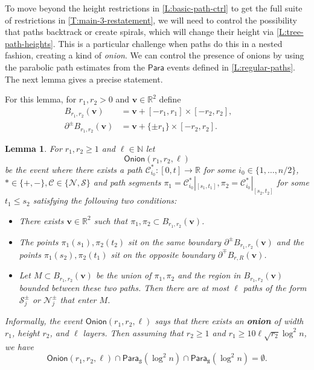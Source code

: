 \documentclass[11pt,twoside]{amsart}
\theoremstyle{plain}
\newtheorem{lem}[thm]{Lemma}
\numberwithin{quest}{section}
\theoremstyle{remark}
\numberwithin{rem}{section}
\theoremstyle{definition}
\newcommand{\N}{\mathbb{N}}
\newcommand{\R}{\mathbb{R}}
\newcommand{\cC}{\mathcal{C}}
\newcommand{\cS}{\mathcal{S}}
\newcommand{\cN}{\mathcal{N}}
\renewcommand{\tt}[1]{{\mathtt{#1}}}
\begin{document}
	To move beyond the height restrictions in \cref{L:basic-path-ctrl} to get the full suite of restrictions in \cref{T:main-3-restatement}, we will need to control the possibility that paths backtrack or create spirals, which will change their height via \cref{L:tree-path-heights}. This is a particular challenge when paths do this in a nested fashion, creating a kind of \emph{onion}. We can control the presence of onions by using the parabolic path estimates from the $\mathsf{Para}$ events defined in \cref{L:regular-paths}. The next lemma gives a precise statement.
	
	For this lemma, for $r_1, r_2 > 0$ and $\mathbf{v} \in \R^2$ define
	\begin{align*}
		B_{r_1, r_2}(\mathbf{v}) &= \mathbf{v} + [-r_1, r_1] \times [-r_2, r_2], \qquad \\
		\partial^\pm B_{r_1, r_2}(\mathbf{v}) &= \mathbf{v} + \{ \pm r_1\} \times [-r_2, r_2].
	\end{align*}
	\begin{lem}
		\label{L:onion-control}
		For $r_1, r_2 \ge 1$ and $\ell \in \N$ let 
		$$
		\mathsf{Onion}(r_1, r_2, \ell)
		$$
		be the event where there exists a path $\cC_{i_0}^*:[0, t] \to \R$ for some $i_0 \in \{1, \dots, n/2\}$, $* \in \{+, -\}, \mathcal C \in \{\cN, \cS\}$ and path segments $\pi_1 = \cC_{i_0}^*|_{[s_1, t_1]}, \pi_2 = \cC_{i_0}^*|_{[s_2, t_2]}$ for some $t_1 \le s_2$ satisfying the following two conditions:
		\begin{itemize}
			\item There exists $\mathbf{v} \in \R^2$ such that $\pi_1, \pi_2 \subset B_{r_1, r_2}(\mathbf{v})$.
			\item The points $\pi_1(s_1), \pi_2(t_2)$ sit on the same boundary $\partial^\pm B_{r_1, r_2}(\mathbf{v})$ and the points $\pi_1(s_2), \pi_2(t_1)$ sit on the opposite boundary $\partial^\mp B_{r, R}(\mathbf{v})$.
			\item Let 
			$
			M
			\subset B_{r_1, r_2}(\mathbf{v})$ be the union of $\pi_1, \pi_2$ and the region in $B_{r_1, r_2}(\mathbf{v})$ bounded between these two paths. Then there are at most $\ell$ paths of the form $\cS_j^\pm$ or $\cN_j^\pm$ that enter $M$.
		\end{itemize}
		Informally, the event $\mathsf{Onion}(r_1, r_2, \ell)$ says that there exists an \textbf{onion} of width $r_1$, height $r_2$, and $\ell$ layers.
		Then assuming that $r_2 \ge 1$ and $r_1 \ge 10 \ell \sqrt{r_2} \log^2 n$, we have 
		\begin{equation}
			\label{E:Onion-r1-empty}
			\mathsf{Onion}(r_1, r_2, \ell) \cap \mathsf{Para}_\tt{S}(\log^2 n) \cap \mathsf{Para}_\tt{N}(\log^2 n) = \emptyset.
		\end{equation}
	\end{lem}
\end{document}
